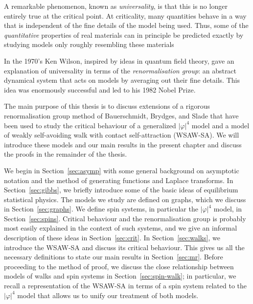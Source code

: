 A remarkable phenomenon, known as \emph{universality}, is that this is no longer
entirely true at the critical point. At criticality, many quantities behave in a
way that is independent of the fine details of the model being used. Thus,
some of the \emph{quantitative} properties of real materials can in principle be
predicted exactly by studying models only roughly resembling these materials

In the 1970's Ken Wilson, inspired by ideas in quantum field theory, gave an
explanation of universality in terms of the \emph{renormalisation group}:
an abstract dynamical system that acts on models by averaging out their fine details.
This idea was enormously successful and led to his 1982 Nobel Prize.

The main purpose of this thesis is to discuss extensions of a
rigorous renormalisation group method of Bauerschmidt, Brydges, and Slade that have
been used to study the
critical behaviour of a generalized $|\varphi|^4$ model and a model of weakly
self-avoiding walk with contact self-attraction (WSAW-SA). We will introduce these
models and our main results in the present chapter and discuss the proofs in the
remainder of the thesis.

We begin in Section~\ref{sec:asymp} with some general background on asymptotic
notation and the method of generating functions and Laplace transforms. In
Section~\ref{sec:gibbs}, we briefly introduce some of the basic ideas of equilibrium
statistical physics. The models we study are defined on graphs, which we
discuss in Section~\ref{sec:graphs}. We define spin systems, in particular
the $|\varphi|^4$ model, in Section~\ref{sec:spins}. Critical behaviour and
the renormalisation group is probably most easily explained in the context of such
systems, and we give an informal description of these ideas in Section~\ref{sec:crit}.
In Section~\ref{sec:walks},
we introduce the WSAW-SA and discuss its critical behaviour. This gives us all
the necessary definitions to state our main results in Section~\ref{sec:mr}.
Before proceeding to the method of proof,
we discuss the close relationship between models of walks and spin systems in
Section~\ref{sec:spin-walk}; in particular, we recall a representation
of the WSAW-SA in terms of a spin system related to the $|\varphi|^4$ model
that allows us to unify our treatment of both models.

